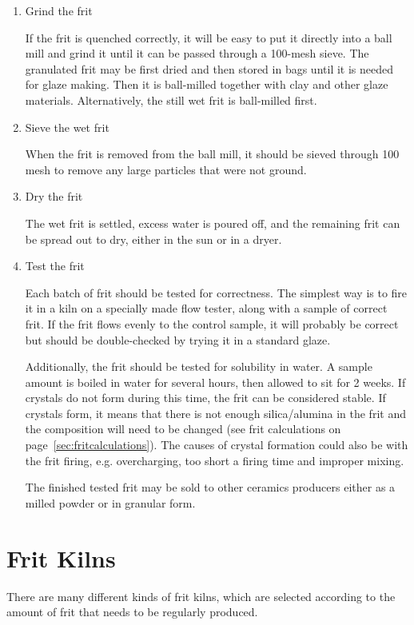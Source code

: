 \begin{enumerate}
\item Grind the frit

If the frit is quenched correctly, it will be easy to put it directly into a 
ball mill and grind it until it can be passed through a 100-mesh sieve. The 
granulated frit may be first dried and then stored in bags until it is needed 
for glaze making. Then it is ball-milled together with clay and other glaze 
materials. Alternatively, the still wet frit is ball-milled first.

\item Sieve the wet frit

When the frit is removed from the ball mill, it should be sieved through 100 
mesh to remove any large particles that were not ground.

\item Dry the frit

The wet frit is settled, excess water is poured off, and the remaining frit can 
be spread out to dry, either in the sun or in a dryer.

\item Test the frit

Each batch of frit should be tested for correctness. The simplest way is to 
fire it in a kiln on a specially made flow tester, along with a sample of 
correct frit. If the frit flows evenly to the control sample, it will probably 
be correct but should be double-checked by trying it in a standard glaze.

Additionally, the frit should be tested for solubility in water. A sample 
amount is boiled in water for several hours, then allowed to sit for 2 weeks. 
If crystals do not form during this time, the frit can be considered stable. If 
crystals form, it means that there is not enough silica/alumina in the frit and 
the composition will need to be changed (see frit calculations on 
page~\ref{sec:fritcalculations}). 
The causes of crystal formation could also be with the frit firing, e.g. 
overcharging, too short a firing time and improper mixing.

The finished tested frit may be sold to other ceramics producers either as a 
milled powder or in granular form.
\end{enumerate}
\section{Frit Kilns}
There are many different kinds of frit kilns, which are selected according to 
the amount of frit that needs to be regularly produced.

